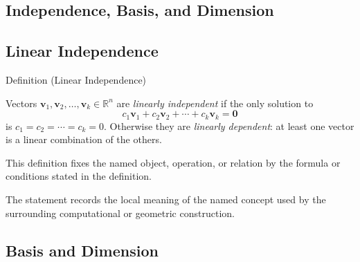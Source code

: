 
\subsection{Independence, Basis, and Dimension}

\subsection*{Linear Independence}

\begin{definitionbox}{Definition (Linear Independence)}
\begin{definition}
\label{def:linear-independence}
Vectors $\mathbf{v}_1, \mathbf{v}_2, \ldots, \mathbf{v}_k \in \mathbb{R}^n$ are
\emph{linearly independent} if the only solution to
\[
  c_1\mathbf{v}_1 + c_2\mathbf{v}_2 + \cdots + c_k\mathbf{v}_k = \mathbf{0}
\]
is $c_1 = c_2 = \cdots = c_k = 0$.
Otherwise they are \emph{linearly dependent}: at least one vector is
a linear combination of the others.
\end{definition}
\end{definitionbox}
\begin{remark*}
This definition fixes the named object, operation, or relation by the formula
or conditions stated in the definition.
\end{remark*}

\begin{remark*}[Interpretation]
The statement records the local meaning of the named concept used by the
surrounding computational or geometric construction.
\end{remark*}

\DefinitionalRoot

\subsection*{Basis and Dimension}

